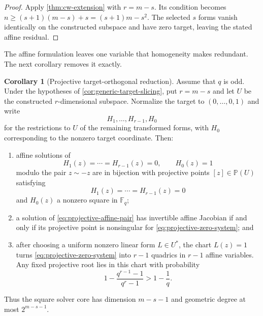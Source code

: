 \documentclass[11pt,a4paper]{article}
\theoremstyle{definition}
\newtheorem{corollary}[theorem]{Corollary}
\theoremstyle{remark}
\newcommand{\F}{\mathbb F}
\newcommand{\PP}{\mathbb P}
\begin{document}
\begin{proof}
Apply \cref{thm:cw-extension} with $r=m-s$.  Its condition becomes
$n\ge(s+1)(m-s)+s=(s+1)m-s^2$.  The selected $s$ forms vanish identically on
the constructed subspace and have zero target, leaving the stated affine
residual.
\end{proof}

The affine formulation leaves one variable that homogeneity makes redundant.
The next corollary removes it exactly.

\begin{corollary}[Projective target-orthogonal reduction]\label{cor:projective-target-slicing}
Assume that $q$ is odd.  Under the hypotheses of \cref{cor:generic-target-slicing}, put $r=m-s$ and let
$U$ be the constructed $r$-dimensional subspace.  Normalize the target to
$(0,\ldots,0,1)$ and write
\[
 H_1,\ldots,H_{r-1},H_0
\]
for the restrictions to $U$ of the remaining transformed forms, with $H_0$
corresponding to the nonzero target coordinate.  Then:
\begin{enumerate}
\item affine solutions of
\begin{equation}\label{eq:projective-affine-pair}
 H_1(z)=\cdots=H_{r-1}(z)=0,
 \qquad H_0(z)=1
\end{equation}
modulo the pair $z\sim-z$ are in bijection with projective points
$[z]\in\PP(U)$ satisfying
\begin{equation}\label{eq:projective-zero-system}
 H_1(z)=\cdots=H_{r-1}(z)=0
\end{equation}
and $H_0(z)$ a nonzero square in $\F_q$;
\item a solution of \eqref{eq:projective-affine-pair} has invertible affine
Jacobian if and only if its projective point is nonsingular for
\eqref{eq:projective-zero-system}; and
\item after choosing a uniform nonzero linear form $L\in U^*$, the chart
$L(z)=1$ turns \eqref{eq:projective-zero-system} into $r-1$ quadrics in
$r-1$ affine variables.  Any fixed projective root lies in this chart with
probability
\[
 1-\frac{q^{r-1}-1}{q^r-1}>1-\frac1q.
\]
\end{enumerate}
Thus the square solver core has dimension $m-s-1$ and geometric degree at most
$2^{m-s-1}$.
\end{corollary}
\end{document}
